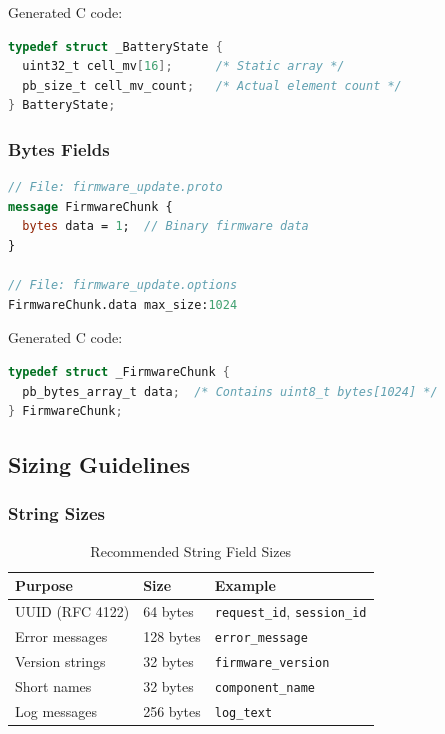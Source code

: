 Generated C code:
\begin{lstlisting}[language=C]
typedef struct _BatteryState {
  uint32_t cell_mv[16];      /* Static array */
  pb_size_t cell_mv_count;   /* Actual element count */
} BatteryState;


\end{lstlisting}
\subsubsection{Bytes Fields}

\begin{lstlisting}[language=proto]
// File: firmware_update.proto
message FirmwareChunk {
  bytes data = 1;  // Binary firmware data
}

// File: firmware_update.options
FirmwareChunk.data max_size:1024
\end{lstlisting}

Generated C code:
\begin{lstlisting}[language=C]
typedef struct _FirmwareChunk {
  pb_bytes_array_t data;  /* Contains uint8_t bytes[1024] */
} FirmwareChunk;


\end{lstlisting}
\subsection{Sizing Guidelines}

\subsubsection{String Sizes}

\begin{table}[H]
\centering
\caption{Recommended String Field Sizes}
\label{tab:string-sizes}
\begin{tabular}{|l|l|l|}
\hline
\textbf{Purpose} & \textbf{Size} & \textbf{Example} \\
\hline
UUID (RFC 4122) & 64 bytes & \texttt{request\_id}, \texttt{session\_id} \\
\hline
Error messages & 128 bytes & \texttt{error\_message} \\
\hline
Version strings & 32 bytes & \texttt{firmware\_version} \\
\hline
Short names & 32 bytes & \texttt{component\_name} \\
\hline
Log messages & 256 bytes & \texttt{log\_text} \\
\hline
\end{tabular}
\end{table}

